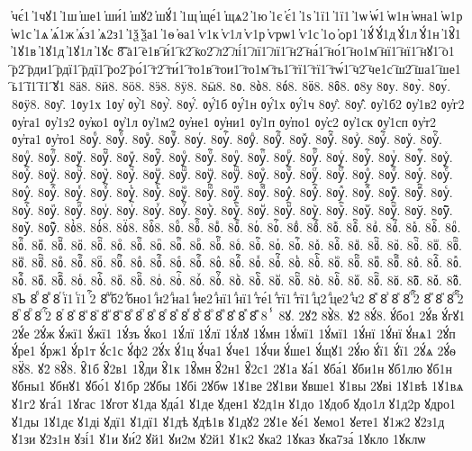 {҆чє́1
҆1чꙋ1
҆1ш
҆ше1
҆ши́1
҆шꙋ2
҆шꙋ́1
҆1щ
҆ще́1
҆щѧ2
҆1ю
҆1є
҆є́1
҆1ѕ
҆1ї1
҆1ї1
҆1ѡ
҆ѡ́1
҆ѡ1н
҆ѡна1
҆ѡ1р
҆ѡ1с
҆1ѧ
҆ѧ́1ж
҆ѧ́з1
҆ѧ2з1
҆1ѯ
҆ѯа1
҆1ѳ
҆ѳа1
҆ѵ1к
҆ѵ1л
҆ѵ1р
҆ѵрѡ1
҆ѵ1с
҆1ѻ
҆ѻр1
҆1ꙋ́
҆ꙋ́1д
҆ꙋ́1л
҆ꙋ́1н
҆1ꙋ̑1
҆1ꙋ1в
҆1ꙋ1д
҆1ꙋ1л
҆1ꙋс
8҇
҇а1
҇е1в
҇и́1
҇к2
҇ко2
҇л2
҇лі́1
҇лї1
҇лї1
҇н2
҇на́1
҇но́1
҇но1м
҇нї1
҇нї1
҇нꙋ1
҇о1
҇р2
҇рди1
҇рдї1
҇рдї1
҇ро2
҇ро́1
҇т2
҇ти́1
҇то1в
҇тои1
҇то1м
҇ть1
҇тї1
҇тї1
҇тѡ́1
҇ч2
҇че1с
҇ш2
҇ша1
҇ше1
҇ь1
҇ї1
҇ї1
҇ꙋ1
8ӓ8.
8ӥ8.
8ӧ8.
8ӭ8.
8ӱ8.
8ӹ8.
8ᲂ.
8ᲂ̀8.
8ᲂ́8.
8ᲂ̈8.
8ᲂ̑8.
ᲂ8у
8ᲂу.
8ᲂу̀.
8ᲂу́.
8ᲂӱ8.
8ᲂу̑.
1ᲂу1х
1ᲂу҆
ᲂу҆̀1
8ᲂу҆̀.
8ᲂу҆́.
ᲂу҆́1б
ᲂу҆́1н
ᲂу҆́1х
ᲂу҆́1ч
8ᲂу҆̈.
8ᲂу҆̑.
ᲂу҆1б2
ᲂу҆1в2
ᲂу҆г2
ᲂу҆га1
ᲂу҆1з2
ᲂу҆ко1
ᲂу҆1л
ᲂу҆1м2
ᲂу҆не1
ᲂу҆ни1
ᲂу҆1п
ᲂу҆по1
ᲂу҆с2
ᲂу҆1ск
ᲂу҆1сп
ᲂу҆т2
ᲂу҆та1
ᲂу҆то1
8ᲂуⷠ.
8ᲂуⷠ҇.
8ᲂуⷡ.
8ᲂуⷡ҇.
8ᲂуⷢ.
8ᲂуⷢ҇.
8ᲂуⷣ.
8ᲂуⷣ҇.
8ᲂуⷤ.
8ᲂуⷤ҇.
8ᲂуⷥ.
8ᲂуⷥ҇.
8ᲂуⷦ.
8ᲂуⷦ҇.
8ᲂуⷧ.
8ᲂуⷧ҇.
8ᲂуⷨ.
8ᲂуⷨ҇.
8ᲂуⷩ.
8ᲂуⷩ҇.
8ᲂуⷪ.
8ᲂуⷪ҇.
8ᲂуⷫ.
8ᲂуⷫ҇.
8ᲂуⷬ.
8ᲂуⷬ҇.
8ᲂуⷭ.
8ᲂуⷭ҇.
8ᲂуⷮ.
8ᲂуⷮ҇.
8ᲂуⷯ.
8ᲂуⷯ҇.
8ᲂуⷰ.
8ᲂуⷰ҇.
8ᲂуⷱ.
8ᲂуⷱ҇.
8ᲂуⷲ.
8ᲂуⷲ҇.
8ᲂуⷳ.
8ᲂуⷳ҇.
8ᲂуⷴ.
8ᲂуⷴ҇.
8ᲂуⷵ.
8ᲂуⷵ҇.
8ᲂуⷶ.
8ᲂуⷶ҇.
8ᲂуⷷ.
8ᲂуⷷ҇.
8ᲂуⷸ.
8ᲂуⷸ҇.
8ᲂуⷹ.
8ᲂуⷹ҇.
8ᲂуⷺ.
8ᲂуⷺ҇.
8ᲂуⷻ.
8ᲂуⷻ҇.
8ᲂуⷼ.
8ᲂуⷼ҇.
8ᲂуⷽ.
8ᲂуⷽ҇.
8ᲂуⷾ.
8ᲂуⷾ҇.
8ᲂуⷿ.
8ᲂуⷿ҇.
8ᲂуꙴ.
8ᲂуꙴ҇.
8ᲂуꙵ.
8ᲂуꙵ҇.
8ᲂуꙶ.
8ᲂуꙶ҇.
8ᲂуꙷ.
8ᲂуꙷ҇.
8ᲂуꙸ.
8ᲂуꙸ҇.
8ᲂуꙹ.
8ᲂуꙹ҇.
8ᲂуꙺ.
8ᲂуꙺ҇.
8ᲂуꙻ.
8ᲂуꙻ҇.
8ᲂу꙼.
8ᲂу꙼҇.
8ᲂу꙽.
8ᲂу꙽҇.
8ᲂ҆̀8.
8ᲂ҆́8.
8ᲂ҆̈8.
8ᲂ҆̑8.
8ᲂⷠ.
8ᲂⷠ҇.
8ᲂⷡ.
8ᲂⷡ҇.
8ᲂⷢ.
8ᲂⷢ҇.
8ᲂⷣ.
8ᲂⷣ҇.
8ᲂⷤ.
8ᲂⷤ҇.
8ᲂⷥ.
8ᲂⷥ҇.
8ᲂⷦ.
8ᲂⷦ҇.
8ᲂⷧ.
8ᲂⷧ҇.
8ᲂⷨ.
8ᲂⷨ҇.
8ᲂⷩ.
8ᲂⷩ҇.
8ᲂⷪ.
8ᲂⷪ҇.
8ᲂⷫ.
8ᲂⷫ҇.
8ᲂⷬ.
8ᲂⷬ҇.
8ᲂⷭ.
8ᲂⷭ҇.
8ᲂⷮ.
8ᲂⷮ҇.
8ᲂⷯ.
8ᲂⷯ҇.
8ᲂⷰ.
8ᲂⷰ҇.
8ᲂⷱ.
8ᲂⷱ҇.
8ᲂⷲ.
8ᲂⷲ҇.
8ᲂⷳ.
8ᲂⷳ҇.
8ᲂⷴ.
8ᲂⷴ҇.
8ᲂⷵ.
8ᲂⷵ҇.
8ᲂⷶ.
8ᲂⷶ҇.
8ᲂⷷ.
8ᲂⷷ҇.
8ᲂⷸ.
8ᲂⷸ҇.
8ᲂⷹ.
8ᲂⷹ҇.
8ᲂⷺ.
8ᲂⷺ҇.
8ᲂⷻ.
8ᲂⷻ҇.
8ᲂⷼ.
8ᲂⷼ҇.
8ᲂⷽ.
8ᲂⷽ҇.
8ᲂⷾ.
8ᲂⷾ҇.
8ᲂⷿ.
8ᲂⷿ҇.
8ᲂꙴ.
8ᲂꙴ҇.
8ᲂꙵ.
8ᲂꙵ҇.
8ᲂꙶ.
8ᲂꙶ҇.
8ᲂꙷ.
8ᲂꙷ҇.
8ᲂꙸ.
8ᲂꙸ҇.
8ᲂꙹ.
8ᲂꙹ҇.
8ᲂꙺ.
8ᲂꙺ҇.
8ᲂꙻ.
8ᲂꙻ҇.
8ᲂ꙼.
8ᲂ꙼҇.
8ᲂ꙽.
8ᲂ꙽҇.
8ᲆ
8ⷠ
8ⷡ
8ⷢ
ⷢї1
ⷢї1
ⷢ҇2
8ⷣ
ⷣб2
ⷣбно1
ⷣн2
ⷣна1
ⷣне2
ⷣнї1
ⷣнї1
ⷣте́1
ⷣтї1
ⷣтї1
ⷣц2
ⷣце2
ⷣч2
8ⷤ
8ⷥ
8ⷦ
8ⷧ
ⷧ҇2
8ⷨ
8ⷩ
8ⷪ
ⷪ҇2
8ⷫ
8ⷬ
8ⷭ
ⷭ҇2
8ⷮ
8ⷯ
8ⷰ
8ⷱ
8ⷲ
8ⷳ
8ⷴ
8ⷵ
8ⷶ
8ⷷ
8ⷸ
8ⷹ
8ⷺ
8ⷻ
8ⷼ
8ⷽ
8ⷾ
8ⷿ
8ⸯ
8ꙋ.
2ꙋ2̀
8ꙋ̀8.
ꙋ2́
8ꙋ́8.
ꙋ́бо1
2ꙋ́в
ꙋ́гꙋ1
2ꙋ́е
2ꙋ́ж
ꙋ́жї1
ꙋ́жї1
1ꙋ́зъ
ꙋ́ко1
1ꙋ́лї
1ꙋ́лї
1ꙋ́лꙋ
1ꙋ́мн
1ꙋ́мї1
1ꙋ́мї1
1ꙋ́нї
1ꙋ́нї
ꙋ́нѧ1
2ꙋ́п
ꙋ́ре1
ꙋ́рж1
ꙋ́р1т
ꙋ́с1с
ꙋ́ф2
2ꙋ́х
ꙋ́1ц
ꙋ́ча1
ꙋ́че1
1ꙋ́чи
ꙋ́ше1
ꙋ́щꙋ1
2ꙋ́ю
ꙋ́ї1
ꙋ́ї1
2ꙋ́ѧ
2ꙋ́ѳ
8ꙋ̈8.
ꙋ2̑
8ꙋ̑8.
ꙋ̑1б
ꙋ̑2в1
1ꙋ̑ди
ꙋ̑1к
1ꙋ̑мн
ꙋ̑2н1
ꙋ̑2с1
2ꙋ1а
ꙋа́1
ꙋба́1
ꙋби1н
ꙋб1лю
ꙋб1н
ꙋбны1
ꙋбнꙋ1
ꙋбо́1
ꙋ1бр
2ꙋбы
1ꙋбі
2ꙋбѡ
1ꙋ1ве
2ꙋ1ви
ꙋвше1
ꙋ1вы
2ꙋві
1ꙋ1вѣ
1ꙋ1вѧ
ꙋ1г2
ꙋга́1
1ꙋгас
1ꙋгот
ꙋ1да
ꙋда́1
ꙋ1де
ꙋден1
ꙋ2д1н
ꙋ1до
1ꙋдоб
ꙋдо1л
ꙋ1д2р
ꙋдро1
ꙋ1ды
1ꙋ1дє
ꙋ1ді
ꙋдї1
ꙋ1дї1
ꙋ1дѣ
ꙋдѣ1в
ꙋ1дꙋ2
2ꙋ1е
ꙋе́1
ꙋемо1
ꙋете1
ꙋ1ж2
ꙋ2з1д
ꙋ1зи
ꙋ2з1н
ꙋзі́1
ꙋ1и
ꙋи́2
ꙋй1
ꙋи2м
ꙋ2й1
ꙋ1к2
ꙋка2
1ꙋказ
ꙋка7за́
1ꙋкло
1ꙋклѡ
}
